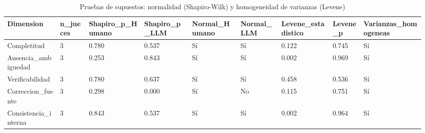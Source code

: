 \begin{table}[htbp]
\centering
\caption{Pruebas de supuestos: normalidad (Shapiro-Wilk) y homogeneidad de varianzas (Levene)}
\label{tab:supuestos}
\begin{tabular}{lllllllll}
\toprule
Dimension & n\_jueces & Shapiro\_p\_Humano & Shapiro\_p\_LLM & Normal\_Humano & Normal\_LLM & Levene\_estadistico & Levene\_p & Varianzas\_homogeneas \\
\midrule
Completitud & 3 & 0.780 & 0.537 & Sí & Sí & 0.122 & 0.745 & Sí \\
Ausencia\_ambiguedad & 3 & 0.253 & 0.843 & Sí & Sí & 0.002 & 0.969 & Sí \\
Verificabilidad & 3 & 0.780 & 0.637 & Sí & Sí & 0.458 & 0.536 & Sí \\
Correccion\_fuente & 3 & 0.298 & 0.000 & Sí & No & 0.115 & 0.751 & Sí \\
Consistencia\_interna & 3 & 0.843 & 0.537 & Sí & Sí & 0.002 & 0.964 & Sí \\
\bottomrule
\end{tabular}
\end{table}
